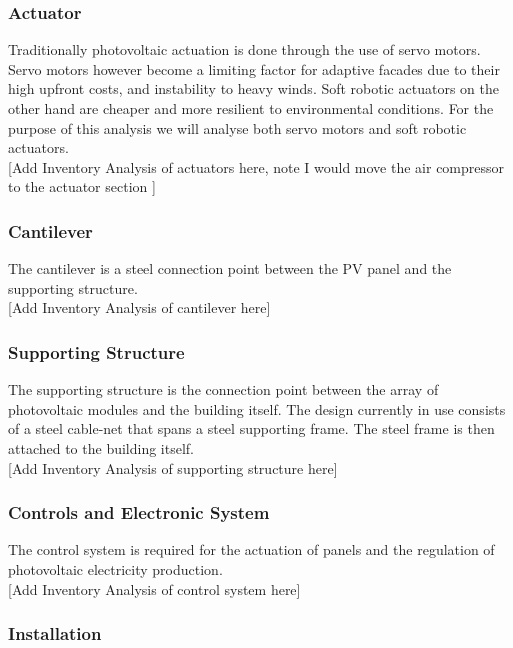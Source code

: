 \subsubsection*{Actuator}
Traditionally photovoltaic actuation is done through the use of servo motors. Servo motors however become a limiting factor for adaptive facades due to their high upfront costs, and instability to heavy winds. Soft robotic actuators on the other hand are cheaper and more resilient to environmental conditions\cite{Svetozarevic2014a}. For the purpose of this analysis we will analyse both servo motors and soft robotic actuators. \\

[Add Inventory Analysis of actuators here, note I would move the air compressor to the actuator section ]

\subsubsection*{Cantilever}
The cantilever is a steel connection point between the PV panel and the supporting structure.\\

[Add Inventory Analysis of cantilever here]

\subsubsection*{Supporting Structure}
The supporting structure is the connection point between the array of photovoltaic modules and the building itself. The design currently in use consists of a steel cable-net that spans a steel supporting frame. The steel frame is then attached to the building itself.\\

[Add Inventory Analysis of supporting structure here]

\subsubsection*{Controls and Electronic System}
The control system is required for the actuation of panels and the regulation of photovoltaic electricity production.\\

[Add Inventory Analysis of control system here]

\subsubsection*{Installation}

